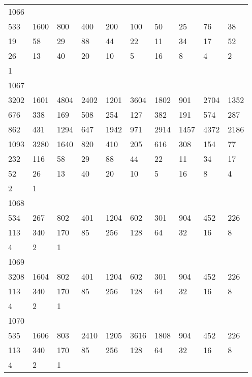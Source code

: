 \begin{longtable}{*{10}{l}}
1066&&&&&&&&&\\
533& 1600& 800& 400& 200& 100& 50& 25& 76& 38\\
19& 58& 29& 88& 44& 22& 11& 34& 17& 52\\
26& 13& 40& 20& 10& 5& 16& 8& 4& 2\\
1& \\

1067&&&&&&&&&\\
3202& 1601& 4804& 2402& 1201& 3604& 1802& 901& 2704& 1352\\
676& 338& 169& 508& 254& 127& 382& 191& 574& 287\\
862& 431& 1294& 647& 1942& 971& 2914& 1457& 4372& 2186\\
1093& 3280& 1640& 820& 410& 205& 616& 308& 154& 77\\
232& 116& 58& 29& 88& 44& 22& 11& 34& 17\\
52& 26& 13& 40& 20& 10& 5& 16& 8& 4\\
2& 1& \\

1068&&&&&&&&&\\
534& 267& 802& 401& 1204& 602& 301& 904& 452& 226\\
113& 340& 170& 85& 256& 128& 64& 32& 16& 8\\
4& 2& 1& \\

1069&&&&&&&&&\\
3208& 1604& 802& 401& 1204& 602& 301& 904& 452& 226\\
113& 340& 170& 85& 256& 128& 64& 32& 16& 8\\
4& 2& 1& \\

1070&&&&&&&&&\\
535& 1606& 803& 2410& 1205& 3616& 1808& 904& 452& 226\\
113& 340& 170& 85& 256& 128& 64& 32& 16& 8\\
4& 2& 1& \\


\end{longtable}
